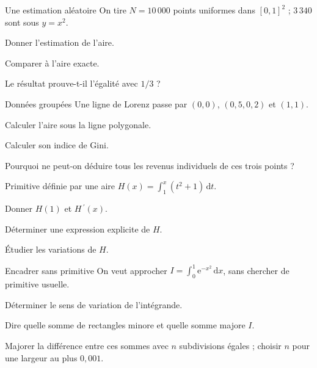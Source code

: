 \begingroup\renewcommand{\otBesoinPlace}[1]{}\begin{minipage}{\linewidth}
\begin{exercice}[3]{Une estimation aléatoire}
On tire $N=10\,000$ points uniformes dans $[0,1]^2$ ; $3\,340$ sont sous $y=x^2$.
\begin{questions}
\item Donner l’estimation de l’aire.
\item Comparer à l’aire exacte.
\item Le résultat prouve-t-il l’égalité avec $1/3$ ?
\end{questions}
\end{exercice}
\begin{exercice}[3]{Données groupées}
Une ligne de Lorenz passe par $(0,0)$, $(0{,}5,0{,}2)$ et $(1,1)$.
\begin{questions}
\item Calculer l’aire sous la ligne polygonale.
\item Calculer son indice de Gini.
\item Pourquoi ne peut-on déduire tous les revenus individuels de ces trois points ?
\end{questions}
\end{exercice}
\begin{exercice}[3]{Primitive définie par une aire}
$H(x)=\int_1^x(t^2+1)\,\mathrm dt$.
\begin{questions}
\item Donner $H(1)$ et $H\,\!^{\prime}(x)$.
\item Déterminer une expression explicite de $H$.
\item Étudier les variations de $H$.
\end{questions}
\end{exercice}
\begin{exercice}[3]{Encadrer sans primitive}
On veut approcher $I=\int_0^1\mathrm e^{-x^2}\,\mathrm dx$, sans chercher de primitive usuelle.
\begin{questions}
\item Déterminer le sens de variation de l’intégrande.
\item Dire quelle somme de rectangles minore et quelle somme majore $I$.
\item Majorer la différence entre ces sommes avec $n$ subdivisions égales ; choisir $n$ pour une largeur au plus $0{,}001$.
\end{questions}
\end{exercice}
\end{minipage}\endgroup
